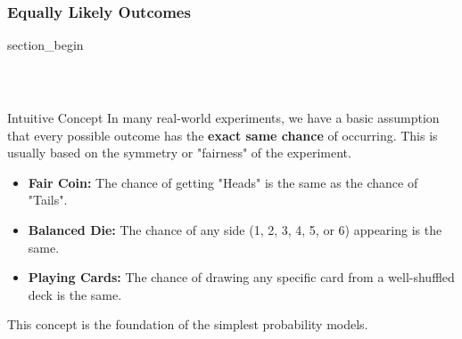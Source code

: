 \subsubsection{Equally Likely Outcomes}
\begin{frame} \vfill \centering \begin{beamercolorbox}[sep=10pt,center,shadow=false,rounded=true]{section_begin} \insertsubsubsectionhead\par \end{beamercolorbox} \vfill \end{frame}
\begin{frame}[t]
\frametitle{\ }
\footnotesize
\vspace{-7mm}
  \begin{block}{Intuitive Concept}
    In many real-world experiments, we have a basic assumption that every possible outcome has the \textbf{exact same chance} of occurring. This is usually based on the symmetry or "fairness" of the experiment.
    \begin{itemize}
        \item \textbf{Fair Coin:} The chance of getting "Heads" is the same as the chance of "Tails".
        \item \textbf{Balanced Die:} The chance of any side (1, 2, 3, 4, 5, or 6) appearing is the same.
        \item \textbf{Playing Cards:} The chance of drawing any specific card from a well-shuffled deck is the same.
    \end{itemize}
    This concept is the foundation of the simplest probability models.
  \end{block}
\end{frame}

